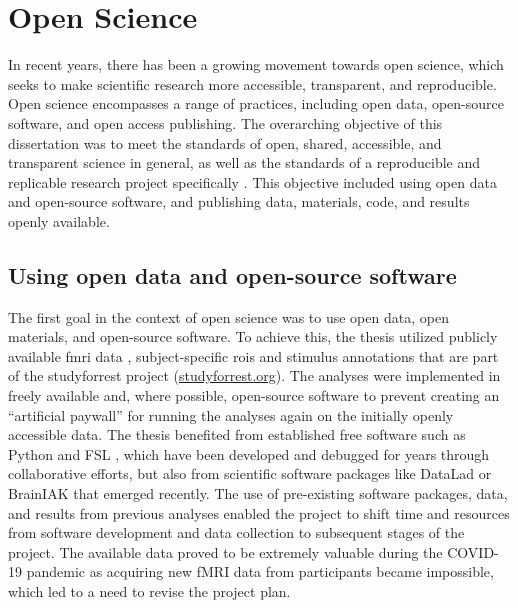 

\section{Open Science}

In recent years, there has been a growing movement towards open science, which
seeks to make scientific research more accessible, transparent, and
reproducible.
%
Open science encompasses a range of practices, including open data, open-source
software, and open access publishing.
%
The overarching objective of this dissertation was to meet the standards of
open, shared, accessible, and transparent science in general, as well as the
standards of a reproducible and replicable research project specifically
\citep[cf.][]{watson2015will, fecher2014open}.
%
This objective included using open data and open-source software, and publishing
data, materials, code, and results openly available.


\subsection{Using open data and open-source software}

%
The first goal in the context of open science was to use open data, open
materials, and open-source software.
%
To achieve this, the thesis utilized publicly available
%
\ac{fmri} data \citep{hanke2014audiomovie, hanke2016simultaneous,
sengupta2016extension},
%
subject-specific \acp{roi} \citep{sengupta2016extension} and
%
stimulus annotations \citep{haeusler2016cutanno}
%
that are part of the studyforrest project
(\href{www.studyforrest.org}{\url{studyforrest.org}}).
%
The analyses were implemented in freely available and, where possible,
open-source software to prevent creating an ``artificial paywall'' for running
the analyses again on the initially openly accessible data.
%
The thesis benefited from established free software such as
%
Python and
%
FSL \citep[\href{https://www.fmrib.ox.ac.uk/fsl}{FMRIB's Software
Library;}][]{smith2004fsl}, which have been developed and debugged for years
through collaborative efforts,
%
but also from scientific software packages like
%
DataLad
\citep[\href{www.datalad.org}{\url{datalad.org}};][]{halchenko2021datalad} or
%
BrainIAK
\citep[\href{https://brainiak.org}{\url{brainiak.org}};][]{kumar2020brainiak,
kumar2020brainiaktutorial}
%
that emerged recently.
%
The use of pre-existing software packages, data, and results from previous
analyses enabled the project to shift time and resources from software
development and data collection to subsequent stages of the project.
%
The available data proved to be extremely valuable during the COVID-19 pandemic
as acquiring new fMRI data from participants became impossible, which led to a
need to revise the project plan.


